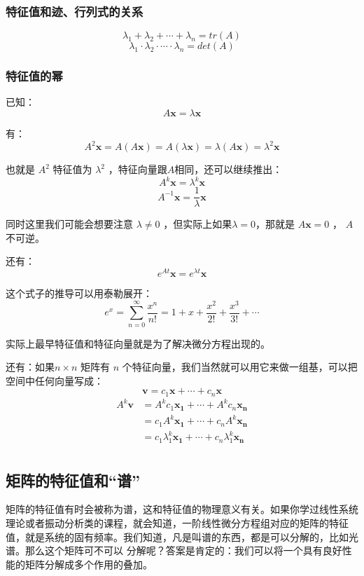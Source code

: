 \documentclass[12pt]{article}
\begin{document}
\subsubsection{特征值和迹、行列式的关系}
$$
\lambda_1 + \lambda_2 + \cdots + \lambda_n = tr(A)
$$
$$
\lambda_1 \cdot \lambda_2 \cdot \cdots \cdot \lambda_n = det(A)
$$

\subsubsection{特征值的幂}
已知：
$$
A\mathbf{x} = \lambda\mathbf{x}
$$

有：
$$
A^2\mathbf{x} = A(A\mathbf{x}) = A(\lambda\mathbf{x}) = \lambda(A\mathbf{x}) = \lambda^2\mathbf{x}
$$

也就是 $A^2$ 特征值为 $\lambda^2$ ，特征向量跟$A$相同，还可以继续推出：
$$
A^k\mathbf{x} = \lambda^k\mathbf{x}
$$
$$
A^{-1}\mathbf{x} = \frac{1}{\lambda}\mathbf{x}
$$

同时这里我们可能会想要注意 $\lambda \ne 0$ ，但实际上如果$\lambda = 0$，那就是 $A\mathbf{x} = 0$ ， $A$不可逆。

还有：
$$
e^{At}\mathbf{x} = e^{\lambda t}\mathbf{x}
$$

这个式子的推导可以用泰勒展开：
$$
e^x = \sum_{n=0}^{\infty}\frac{x^n}{n!} = 1 + x + \frac{x^2}{2!} + \frac{x^3}{3!} + \cdots
$$

实际上最早特征值和特征向量就是为了解决微分方程出现的。

还有：如果$n \times n$ 矩阵有 $n$ 个特征向量，我们当然就可以用它来做一组基，可以把空间中任何向量写成：
$$
\mathbf{v} = c_1\mathbf{x} + \cdots + c_n\mathbf{x}
$$
\begin{align*}
A^k\mathbf{v} &= A^kc_1\mathbf{x_1} + \cdots + A^kc_n\mathbf{x_n} \\
    &= c_1A^k\mathbf{x_1} + \cdots + c_nA^k\mathbf{x_n} \\
   &= c_1\lambda_1^k\mathbf{x_1} + \cdots + c_n\lambda_1^k\mathbf{x_n} \\
\end{align*}


\subsection{矩阵的特征值和“谱”\cite{Fantastic_Matrix_1}}
矩阵的特征值有时会被称为谱，这和特征值的物理意义有关。如果你学过线性系统理论或者振动分析类的课程，就会知道，一阶线性微分方程组对应的矩阵的特征值，就是系统的固有频率。我们知道，凡是叫谱的东西，都是可以分解的，比如光谱。那么这个矩阵可不可以 分解呢？答案是肯定的：我们可以将一个具有良好性能的矩阵分解成多个作用的叠加。
\end{document}
